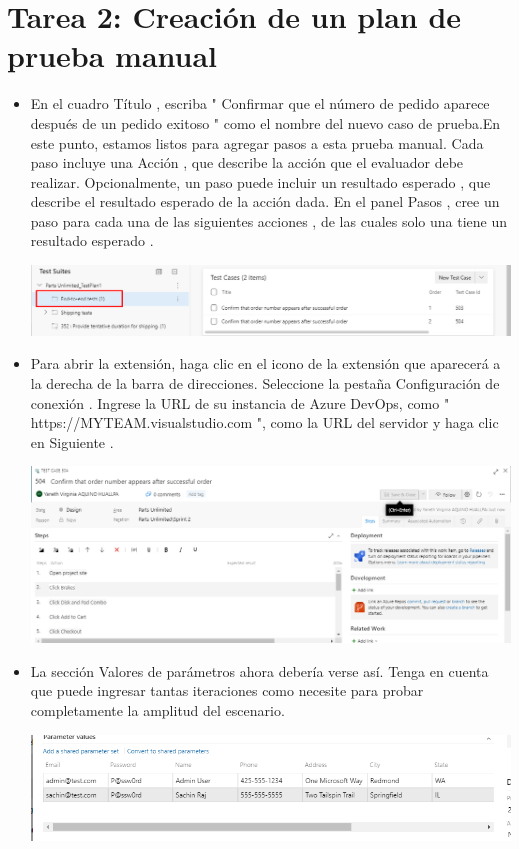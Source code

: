 \section{Tarea 2: Creación de un plan de prueba manual } 
\begin{itemize}
\item En el cuadro Título , escriba " Confirmar que el número de pedido aparece después de un pedido exitoso " como el nombre del nuevo caso de prueba.En este punto, estamos listos para agregar pasos a esta prueba manual. Cada paso incluye una Acción , que describe la acción que el evaluador debe realizar. Opcionalmente, un paso puede incluir un resultado esperado , que describe el resultado esperado de la acción dada. En el panel Pasos , cree un paso para cada una de las siguientes acciones , de las cuales solo una tiene un resultado esperado .
\begin{center}
\includegraphics[width=\columnwidth]{images/32}\newline
\end{center} 
\item Para abrir la extensión, haga clic en el icono de la extensión que aparecerá a la derecha de la barra de direcciones. Seleccione la pestaña Configuración de conexión . Ingrese la URL de su instancia de Azure DevOps, como " https://MYTEAM.visualstudio.com ", como la URL del servidor y haga clic en Siguiente .
\begin{center}
\includegraphics[width=\columnwidth]{images/30}\newline
\end{center} 
\item La sección Valores de parámetros ahora debería verse así. Tenga en cuenta que puede ingresar tantas iteraciones como necesite para probar completamente la amplitud del escenario.
\begin{center}
\includegraphics[width=\columnwidth]{images/31}\newline
\end{center} 

\end{itemize}
